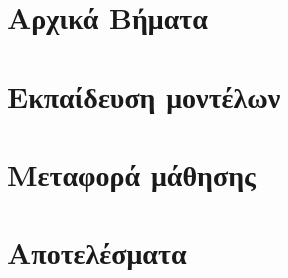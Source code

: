 \documentclass[11pt,a4paper]{report}
\begin{document}
\pagestyle{fancy}%

\clearpage
{}
\begingroup
\makeatletter \let\ps@plain\ps@empty \makeatother
\tableofcontents
\endgroup
\clearpage
{}
\chapter{Αρχικά Βήματα}
\thispagestyle{empty} %

\chapter{Εκπαίδευση μοντέλων}
\thispagestyle{empty} %

\chapter{Μεταφορά μάθησης}
\thispagestyle{empty} %

\chapter{Αποτελέσματα}
\thispagestyle{empty} %

\renewcommand{\thepage}{}

\nocite{*}%

\end{document}
